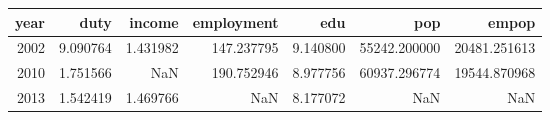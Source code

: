 \begin{tabular}{rrrrrrr}
\toprule
 year &      duty &    income &  employment &       edu &           pop &         empop \\
\midrule
 2002 &  9.090764 &  1.431982 &  147.237795 &  9.140800 &  55242.200000 &  20481.251613 \\
 2010 &  1.751566 &       NaN &  190.752946 &  8.977756 &  60937.296774 &  19544.870968 \\
 2013 &  1.542419 &  1.469766 &         NaN &  8.177072 &           NaN &           NaN \\
\bottomrule
\end{tabular}
